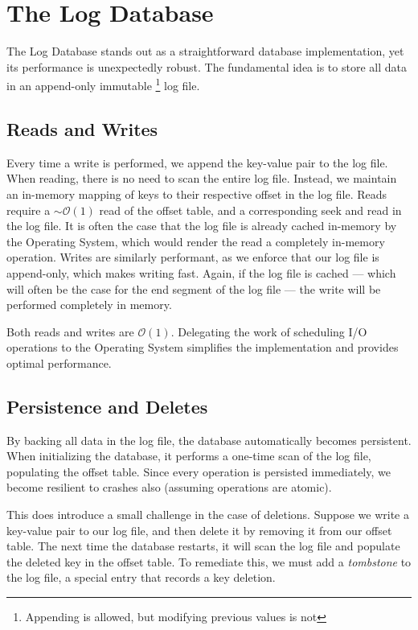 \documentclass[10pt]{extarticle}
\begin{document}
\section{The Log Database}

The Log Database stands out as a straightforward database implementation, yet its performance is unexpectedly robust. The fundamental idea is to store all data in an append-only immutable \footnote{Appending is allowed, but modifying previous values is not} log file. 

\subsection{Reads and Writes}
Every time a write is performed, we append the key-value pair to the log file. When reading, there is no need to scan the entire log file. Instead, we maintain an in-memory mapping of keys to their respective offset in the log file. Reads require a $\sim \mathcal{O}(1)$ read of the offset table, and a corresponding seek and read in the log file. It is often the case that the log file is already cached in-memory by the Operating System, which would render the read a completely in-memory operation. Writes are similarly performant, as we enforce that our log file is append-only, which makes writing fast. Again, if the log file is cached --- which will often be the case for the end segment of the log file --- the write will be performed completely in memory. 

Both reads and writes are $\mathcal{O}(1)$. Delegating the work of scheduling I/O operations to the Operating System simplifies the implementation and provides optimal performance. 

\subsection{Persistence and Deletes}
By backing all data in the log file, the database automatically becomes persistent. When initializing the database, it performs a one-time scan of the log file, populating the offset table. Since every operation is persisted immediately, we become resilient to crashes also (assuming operations are atomic).

This does introduce a small challenge in the case of deletions. Suppose we write a key-value pair to our log file, and then delete it by removing it from our offset table. The next time the database restarts, it will scan the log file and populate the deleted key in the offset table. To remediate this, we must add a \textit{tombstone} to the log file, a special entry that records a key deletion.
\end{document}

